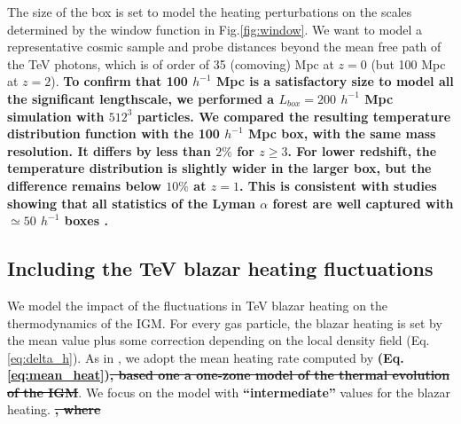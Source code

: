 \documentclass[twocolumns]{emulateapj}
\newcommand\ALc[1]{{\color{red} \bf #1}} %
\begin{document}
{The size of the box is set to model the heating perturbations on the scales determined by the window function in Fig.\ref{fig:window}. We want to model a representative cosmic sample and probe distances beyond the mean free path of the TeV photons, which is of order of 35 (comoving) Mpc at $z=0$ (but 100 Mpc at $z=2$). \ALc{ To confirm that 100 $h^{-1}$ Mpc is a satisfactory size to model all the significant lengthscale, we performed a $L_{box}=200 $ $h^{-1}$ Mpc simulation with $512^3$ particles. We compared the resulting temperature distribution function with the 100 $h^{-1}$ Mpc box, with the same mass resolution.  It differs by less than $2\%$ for $z\geqslant 3$. For lower redshift, the temperature distribution is slightly wider in the larger box, but the difference remains below $10\%$ at $z=1$. This is consistent with studies showing that all statistics of the Lyman $\alpha$ forest are well captured with $\simeq 50$ $h^{-1}$ boxes \citep{2007MNRAS.374..196R,2009MNRAS.398L..26B}.}



\subsection{Including the TeV blazar heating fluctuations}
We model the impact of the fluctuations in TeV blazar heating on the thermodynamics of the IGM. For every gas particle, the blazar heating is set by the mean value plus some correction depending on the local density field (Eq. \ref{eq:delta_h}). As in \citet{2012MNRAS.423..149P}, we adopt the mean heating rate computed by \citet{2012ApJ...752...23C}\ALc{ (Eq. \ref{eq:mean_heat})\sout{, based one a one-zone model of the thermal evolution of the IGM}}. We focus on the model with \ALc{``intermediate''} values for the blazar heating.\ALc{\sout{, where }}

}
\end{document}
